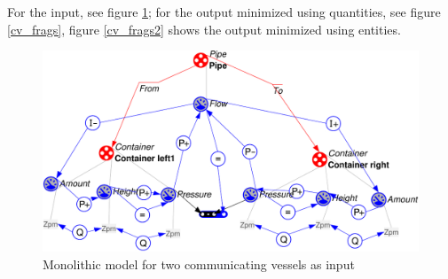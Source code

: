 \documentclass{article} %
\begin{document}
For the input, see figure \ref{cv_mono}; for the output minimized using
quantities, see figure \ref{cv_frags}, figure \ref{cv_frags2} shows the output
minimized using entities.



\begin{figure}[ht]
\centering
\includegraphics[scale=0.5]{cv2_mono-crop.pdf}
\caption{Monolithic model for two communicating vessels as input}
\label{cv_mono}
\end{figure}
\end{document}
